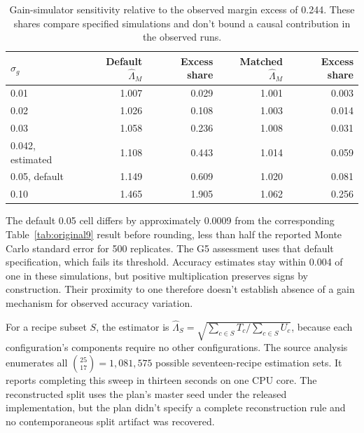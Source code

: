 \begin{table}[htbp]
\centering\small
\caption{Gain-simulator sensitivity relative to the observed margin excess of 0.244. These shares compare specified simulations and don't bound a causal contribution in the observed runs.}
\label{tab:original13}
\begin{tabular}{lrrrr}\hline
$\sigma_g$ & Default $\widehat\Lambda_M$ & Excess share & Matched $\widehat\Lambda_M$ & Excess share\\\hline
0.01 & 1.007 & 0.029 & 1.001 & 0.003\\
0.02 & 1.026 & 0.108 & 1.003 & 0.014\\
0.03 & 1.058 & 0.236 & 1.008 & 0.031\\
0.042, estimated & 1.108 & 0.443 & 1.014 & 0.059\\
0.05, default & 1.149 & 0.609 & 1.020 & 0.081\\
0.10 & 1.465 & 1.905 & 1.062 & 0.256\\\hline
\end{tabular}
\end{table}

The default 0.05 cell differs by approximately 0.0009 from the corresponding Table~\ref{tab:original9} result before rounding, less than half the reported Monte Carlo standard error for 500 replicates. The G5 assessment uses that default specification, which fails its threshold. Accuracy estimates stay within 0.004 of one in these simulations, but positive multiplication preserves signs by construction. Their proximity to one therefore doesn't establish absence of a gain mechanism for observed accuracy variation.

For a recipe subset $S$, the estimator is $\widehat\Lambda_S=\sqrt{\sum_{c\in S}T_c/\sum_{c\in S}U_c}$, because each configuration's components require no other configurations. The source analysis enumerates all $\binom{25}{17}=1{,}081{,}575$ possible seventeen-recipe estimation sets. It reports completing this sweep in thirteen seconds on one CPU core. The reconstructed split uses the plan's master seed under the released implementation, but the plan didn't specify a complete reconstruction rule and no contemporaneous split artifact was recovered.

